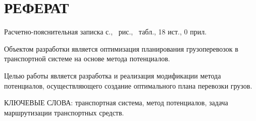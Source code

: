 \section*{РЕФЕРАТ}

Расчетно-пояснительная записка \pageref{LastPage} с., \totalfigures\ рис., \totaltables\ табл., 18 ист., 0 прил.

Объектом разработки является оптимизация планирования грузоперевозок в транспортной системе на основе метода потенциалов.

Целью работы является разработка и реализация модификации метода потенциалов, осуществляющего создание оптимального плана перевозки грузов.

КЛЮЧЕВЫЕ СЛОВА: транспортная система, метод потенциалов, задача маршрутизации транспортных средств.

\pagebreak